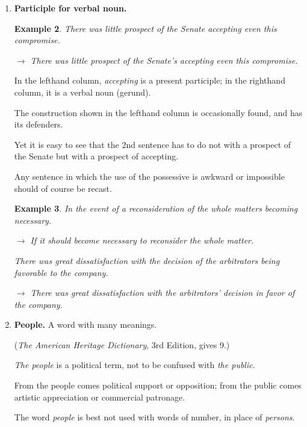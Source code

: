 \documentclass{article}
\newtheorem{example}{Example}
\begin{document}
\begin{enumerate}
	{\it Partly} carries the idea of a part as distinct from the whole - usually a physical object.
	\begin{example}
		The log was partially submerged.
		
		$\to$ The log was partly submerged.
		
		She was partially in and partially out.
		
		$\to$ She was partly in and partly out./She was part in, part out.
	\end{example}
	\item {\bf Participle for verbal noun.}
	\begin{example}
		There was little prospect of the Senate accepting even this compromise.
		
		$\to$ There was little prospect of the Senate's accepting even this compromise.
	\end{example}
	In the lefthand column, {\it accepting} is a present participle; in the righthand column, it is a verbal noun (gerund).
	
	The construction shown in the lefthand column is occasionally found, and has its defenders.
	
	Yet it is easy to see that the 2nd sentence has to do not with a prospect of the Senate but with a prospect of accepting.
	
	Any sentence in which the use of the possessive is awkward or impossible should of course be recast.
	\begin{example}
		In the event of a reconsideration of the whole matters becoming necessary.
		
		$\to$ If it should become necessary to reconsider the whole matter.
		
		There was great dissatisfaction with the decision of the arbitrators being favorable to the company.
		
		$\to$ There was great dissatisfaction with the arbitrators' decision in favor of the company.
	\end{example}
	\item {\bf People.} A word with many meanings.
	
	({\it The American Heritage Dictionary}, 3rd Edition, gives 9.)
	
	{\it The people} is a political term, not to be confused with {\it the public}.
	
	From the people comes political support or opposition; from the public comes artistic appreciation or commercial patronage.
	
	The word {\it people} is best not used with words of number, in place of {\it persons}.
	

\end{enumerate}
\end{document}
